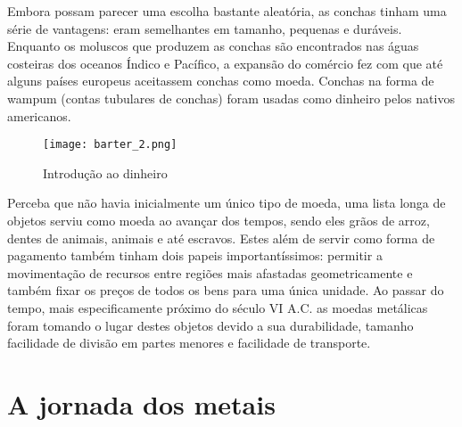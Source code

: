 \begin{citacao}
	Embora possam parecer uma escolha bastante aleatória, as conchas tinham uma série de vantagens: eram semelhantes em tamanho, pequenas e duráveis. Enquanto os moluscos que produzem as conchas são encontrados nas águas costeiras dos oceanos Índico e Pacífico, a expansão do comércio fez com que até alguns países europeus aceitassem conchas como moeda. Conchas na forma de wampum (contas tubulares de conchas) foram usadas como dinheiro pelos nativos americanos. \cite{BRIT}
\end{citacao}

\begin{figure}[H]
	\centering
	\caption{Introdução ao dinheiro}\label{intro_money}
	\texttt{[image: barter\_2.png]}
	\\
\end{figure}



Perceba que não havia inicialmente um único tipo de moeda, uma lista longa de objetos serviu como moeda ao avançar dos tempos, sendo eles grãos de arroz, dentes de animais, animais e até escravos. Estes além de servir como forma de pagamento também tinham dois papeis importantíssimos: permitir a movimentação de recursos entre regiões mais afastadas geometricamente e também fixar os preços de todos os bens para uma única unidade. Ao passar do tempo, mais especificamente próximo do século VI A.C. as moedas metálicas foram tomando o lugar destes objetos devido a sua durabilidade, tamanho facilidade de divisão em partes menores e facilidade de transporte. 


\section{A jornada dos metais}\label{metals}

